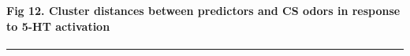 \documentclass[11pt]{article}
\begin{document}
    \begin{center}
    \end{center}
    { \hspace*{\fill} \\}
    
    \paragraph{Fig 12. Cluster distances between predictors and CS odors in
response to 5-HT
activation}\label{fig-12.-cluster-distances-between-predictors-and-cs-odors-in-response-to-5-ht-activation}

\begin{center}\rule{0.5\linewidth}{\linethickness}\end{center}


    
    
    
    
\end{document}
